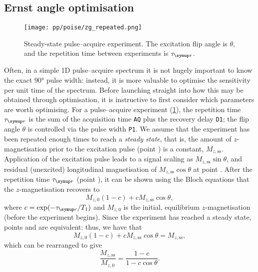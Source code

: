 \subsection{Ernst angle optimisation}
\label{subsec:poise__ernst}

\begin{figure}[htb]
    \centering
    \texttt{[image: pp/poise/zg\_repeated.png]}%
    \caption[Steady-state pulse--acquire experiment]{Steady-state pulse--acquire experiment. The excitation flip angle is $\theta$, and the repetition time between experiments is $\taur$.}
    \label{fig:zg_ernst}
\end{figure}

Often, in a simple 1D pulse--acquire spectrum it is not hugely important to know the exact \ang{90} pulse width: instead, it is more valuable to optimise the sensitivity per unit time of the spectrum.
Before launching straight into how this may be obtained through optimisation, it is instructive to first consider which parameters are worth optimising.
For a pulse--acquire experiment (\cref{fig:zg_ernst}), the repetition time $\taur$ is the sum of the acquisition time \texttt{AQ} plus the recovery delay \texttt{D1}; the flip angle $\theta$ is controlled via the pulse width \texttt{P1}.
We assume that the experiment has been repeated enough times to reach a \textit{steady state}, that is, the amount of $z$-magnetisation prior to the excitation pulse (point ) is a constant, $M_{z,\text{ss}}$.
Application of the excitation pulse leads to a signal scaling as $M_{z,\text{ss}}\sin\theta$, and residual (unexcited) longitudinal magnetisation of $M_{z,\text{ss}}\cos\theta$ at point .
After the repetition time $\taur$ (point ), it can be shown using the Bloch equations\autocite{Bloch1946PR} that the $z$-magnetisation recovers to
\begin{equation}
    \label{eq:z_magn_ernst1}
    M_{z,0}(1 - c) + cM_{z,\text{ss}}\cos\theta,
\end{equation}
where $c = \exp(-\taur/T_1)$ and $M_{z,0}$ is the initial, equilibrium $z$-magnetisation (before the experiment begins).
Since the experiment has reached a steady state, points  and  are equivalent: thus, we have that
\begin{equation}
    \label{eq:z_magn_ernst2}
    M_{z,0}(1 - c) + cM_{z,\text{ss}}\cos\theta = M_{z,\text{ss}},
\end{equation}
which can be rearranged to give
\begin{equation}
    \label{eq:z_magn_ernst3}
    \frac{M_{z,\text{ss}}}{M_{z,0}} = \frac{1 - c}{1 - c\cos\theta}.
\end{equation}
